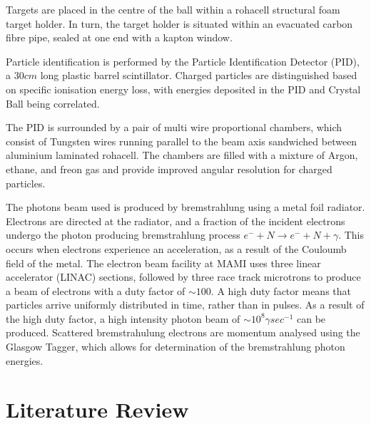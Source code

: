 \documentclass[a4paper,12pt]{article}
\begin{document}
Targets are placed in the centre of the ball within a rohacell structural foam target holder\cite{tarbertThesis}{}. In turn, the target holder is situated within an evacuated carbon fibre pipe, sealed at one end with a kapton window.

Particle identification is performed by the Particle Identification Detector (PID), a $30cm$ long plastic barrel scintillator. Charged particles are distinguished based on specific ionisation energy loss, with energies deposited in the PID and Crystal Ball being correlated\cite{tarbertThesis}{}.

The PID is surrounded by a pair of multi wire proportional chambers, which consist of Tungsten wires running parallel to the beam axis sandwiched between aluminium laminated rohacell. The chambers are filled with a mixture of Argon, ethane, and freon gas and provide improved angular resolution for charged particles\cite{tarbertThesis}{}.

The photons beam used is produced by bremstrahlung using a metal foil radiator\cite{watts}{}. Electrons are directed at the radiator, and a fraction of the incident electrons undergo the photon producing bremstrahlung process\cite{tarbertThesis}{} $e^{-}+N \rightarrow e^{-}+N+\gamma$. This occurs when electrons experience an acceleration, as a result of the Couloumb field of the metal. The electron beam facility at MAMI uses three linear accelerator (LINAC) sections, followed by three race track microtrons to produce a beam of electrons with a duty factor of $\sim100$. A high duty factor means that particles arrive uniformly distributed in time, rather than in pulses\cite{wiedemann}{}. As a result of the high duty factor, a high intensity photon beam of $\sim10^{8} \gamma sec^{-1}$ can be produced. Scattered bremstrahulung electrons are momentum analysed using the Glasgow Tagger\cite{anthonyTagger}{}, which allows for determination of the bremstrahlung photon energies\cite{watts}{}.

\section{Literature Review}
\end{document}

